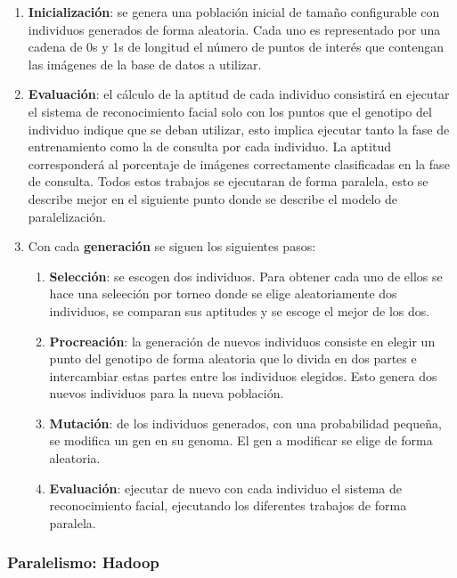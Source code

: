 \begin{enumerate}
	\item \textbf{Inicializaci\'on}: se genera una poblaci\'on inicial de tama\~no configurable con individuos generados de forma aleatoria. Cada uno es representado por una cadena de 0s y 1s de longitud el n\'umero de puntos de inter\'es que contengan las im\'agenes de la base de datos a utilizar.
	\item \textbf{Evaluaci\'on}: el c\'alculo de la aptitud de cada individuo consistirá en ejecutar el sistema de reconocimiento facial solo con los puntos que el genotipo del individuo indique que se deban utilizar, esto implica ejecutar tanto la fase de entrenamiento como la de consulta por cada individuo. La aptitud corresponderá al porcentaje de imágenes correctamente clasificadas en la fase de consulta. Todos estos trabajos se ejecutaran de forma paralela, esto se describe mejor en el siguiente punto donde se describe el modelo de paralelizaci\'on.
	\item Con cada \textbf{generaci\'on} se siguen los siguientes pasos:
	\begin{enumerate}
		\item \textbf{Selecci\'on}: se escogen dos individuos. Para obtener cada uno de ellos se hace una seleeci\'on por torneo donde se elige aleatoriamente dos individuos, se comparan sus aptitudes y se escoge el mejor de los dos.
		\item \textbf{Procreaci\'on}: la generaci\'on de nuevos individuos consiste en elegir un punto del genotipo de forma aleatoria que lo divida en dos partes e intercambiar estas partes entre los individuos elegidos. Esto genera dos nuevos individuos para la nueva poblaci\'on.
		\item \textbf{Mutaci\'on}: de los individuos generados, con una probabilidad peque\~na, se modifica un gen en su genoma. El gen a modificar se elige de forma aleatoria.
		\item \textbf{Evaluaci\'on}: ejecutar de nuevo con cada individuo el sistema de reconocimiento facial, ejecutando los diferentes trabajos de forma paralela.
	\end{enumerate}
\end{enumerate}

\subsubsection{Paralelismo: Hadoop}


